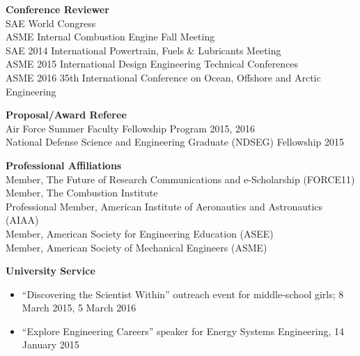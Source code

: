 \documentclass[margin,line,11pt]{res}
\begin{document}
\begin{resume}
\textbf{Conference Reviewer} \\
SAE World Congress\\
ASME Internal Combustion Engine Fall Meeting\\
SAE 2014 International Powertrain, Fuels \& Lubricants Meeting \\
ASME 2015 International Design Engineering Technical Conferences \\
ASME 2016 35th International Conference on Ocean, Offshore and Arctic Engineering

\textbf{Proposal\slash Award Referee} \\
Air Force Summer Faculty Fellowship Program 2015, 2016 \\
National Defense Science and Engineering Graduate (NDSEG) Fellowship 2015

\textbf{Professional Affiliations} \\
Member, The Future of Research Communications and e-Scholarship (FORCE11) \\
Member, The Combustion Institute \\
Professional Member, American Institute of Aeronautics and Astronautics (AIAA) \\
Member, American Society for Engineering Education (ASEE) \\
Member, American Society of Mechanical Engineers (ASME)

\textbf{University Service}
\begin{itemize}[leftmargin=*]
\item ``Discovering the Scientist Within'' outreach event for middle-school girls; 8 March 2015, 5 March 2016
\item ``Explore Engineering Careers'' speaker for Energy Systems Engineering, 14 January 2015
\end{itemize}


\end{resume}
\end{document}
